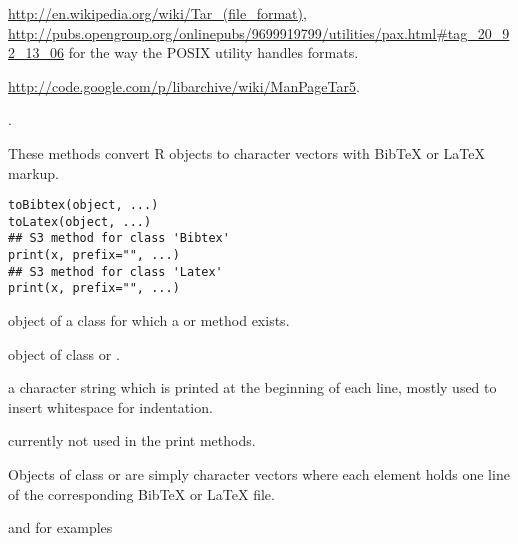 %
\begin{SeeAlso}\relax
\url{http://en.wikipedia.org/wiki/Tar_(file_format)},
\url{http://pubs.opengroup.org/onlinepubs/9699919799/utilities/pax.html#tag_20_92_13_06}
for the way the POSIX utility  handles  formats.

\url{http://code.google.com/p/libarchive/wiki/ManPageTar5}.

.
\end{SeeAlso}
%
\begin{Description}\relax
These methods convert R objects to character vectors with
BibTeX or LaTeX markup.
\end{Description}
%
\begin{Usage}
\begin{verbatim}
toBibtex(object, ...)
toLatex(object, ...)
## S3 method for class 'Bibtex'
print(x, prefix="", ...)
## S3 method for class 'Latex'
print(x, prefix="", ...)
\end{verbatim}
\end{Usage}
%
\begin{Arguments}
\begin{ldescription}
\item[\code{object}] object of a class for which a  or
 method exists.
\item[\code{x}] object of class  or
.
\item[\code{prefix}] a character string which is printed at the beginning of
each line, mostly used to insert whitespace for indentation.
\item[\code{...}] currently not used in the print methods.
\end{ldescription}
\end{Arguments}
%
\begin{Details}\relax
Objects of class  or  are simply
character vectors where each element holds one line of the
corresponding BibTeX or LaTeX file.
\end{Details}
%
\begin{SeeAlso}\relax
{} and  for examples
\end{SeeAlso}
